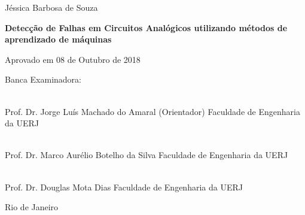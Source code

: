 \addtocounter{page}{+1}
\begin{center}

Jéssica Barbosa de Souza

\vspace{1cm}

\textbf{Detecção de Falhas em Circuitos Analógicos utilizando métodos de aprendizado de máquinas}

\end{center}

\vspace{.6cm}

\begin{flushright}
\parbox{8cm}{
}
\end{flushright}

\vspace{.9cm}



\noindent Aprovado em 08 de Outubro de 2018

\noindent Banca Examinadora:


%
%
%
%



\vspace{1.0cm}

\begin{flushright}
\parbox{13cm}{

\singlespacing

\hrulefill \\

\vspace{-.3cm}
Prof. Dr. Jorge Luís Machado do Amaral (Orientador)
\newline
Faculdade de Engenharia da UERJ
\vspace{1.9cm}

\hrulefill \\

\vspace{-.3cm}
Prof. Dr. Marco Aurélio Botelho da Silva  
\newline
Faculdade de Engenharia da UERJ
\vspace{1.9cm}

\hrulefill \\

\vspace{-.3cm}
Prof. Dr. Douglas Mota Dias
\newline
Faculdade de Engenharia da UERJ
\vspace{.6cm}





}
\end{flushright}
\vfill

\begin{center}
Rio de Janeiro
\end{center}
